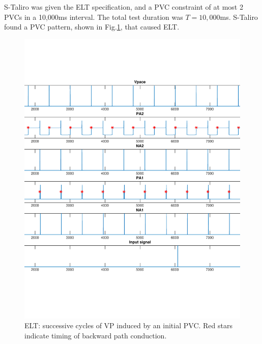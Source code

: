 S-Taliro was given the ELT specification, and a PVC constraint of at most 2 PVCs in a 10,000ms interval. 
The total test duration was $T= 10,000$ms.
S-Taliro found a PVC pattern, shown in Fig.\ref{fig:bug13_kept1}, that caused ELT.
\begin{figure}[t]
\centering
\includegraphics[scale=0.4]{figures/bug13_kept1}
\caption{ELT: successive cycles of VP induced by an initial PVC. Red stars indicate timing of backward path conduction.}
\label{fig:bug13_kept1}
\end{figure}


